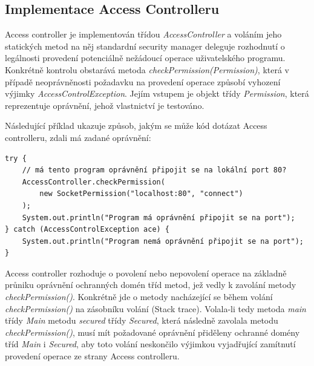 \subsection{Implementace Access Controlleru}\label{implementaceAC}

Access controller je implementován třídou {\it AccessController} a voláním jeho statických metod na něj standardní security manager deleguje rozhodnutí o legálnosti provedení potenciálně nežádoucí operace uživatelského programu. Konkrétně kontrolu obstarává metoda {\it checkPermission(Permission)}, která v případě neoprávněnosti požadavku na provedení operace způsobí vyhození výjimky {\it AccessControlException}. Jejím vstupem je objekt třídy {\it Permission}, která reprezentuje oprávnění, jehož vlastnictví je testováno. \cite[5.5]{oaks}\cite[6]{oaks}

Následující příklad ukazuje způsob, jakým se může kód dotázat Access controlleru, zdali má zadané oprávnění: \cite[5.5]{oaks}

\begin{verbatim}
try {
    // má tento program oprávnění připojit se na lokální port 80?
    AccessController.checkPermission(
        new SocketPermission("localhost:80", "connect")
    );
    System.out.println("Program má oprávnění připojit se na port");
} catch (AccessControlException ace) {
    System.out.println("Program nemá oprávnění připojit se na port");
}
\end{verbatim}

Access controller rozhoduje o povolení nebo nepovolení operace na základně průniku oprávnění ochranných domén tříd metod, jež vedly k zavolání metody {\it checkPermission()}. Konkrétně jde o metody nacházející se během volání {\it checkPermission()} na zásobníku volání (Stack trace). Volala-li tedy metoda {\it main} třídy {\it Main} metodu {\it secured} třídy {\it Secured}, která následně zavolala metodu {\it checkPermission()}, musí mít požadované oprávnění přiděleny ochranné domény tříd {\it Main} i {\it Secured}, aby toto volání neskončilo výjimkou vyjadřující zamítnutí provedení operace ze strany Access controlleru. \cite[5.5]{oaks}\cite[6.1]{oaks}


%

